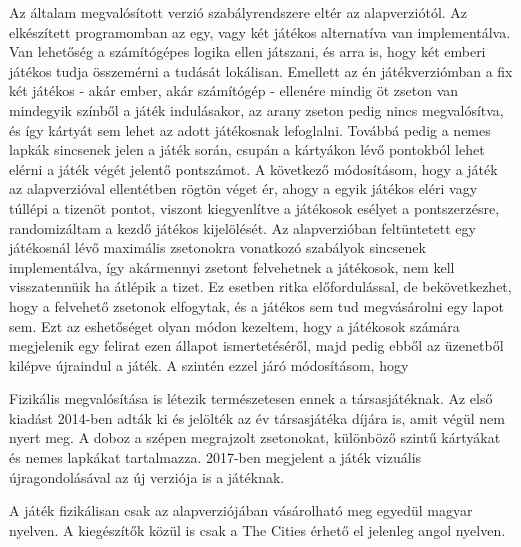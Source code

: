Az általam megvalósított verzió szabályrendszere eltér az alapverziótól. Az elkészített programomban az egy, vagy két játékos alternatíva van implementálva. Van lehetőség a számítógépes logika ellen játszani, és arra is, hogy két emberi játékos tudja összemérni a tudását lokálisan. Emellett az én játékverziómban a fix két játékos - akár ember, akár számítógép - ellenére mindig öt zseton van mindegyik színből a játék indulásakor, az arany zseton pedig nincs megvalósítva, és így kártyát sem lehet az adott játékosnak lefoglalni. Továbbá pedig a nemes lapkák sincsenek jelen a játék során, csupán a kártyákon lévő pontokból lehet elérni a játék végét jelentő pontszámot. A következő módosításom, hogy a játék az alapverzióval ellentétben rögtön véget ér, ahogy a egyik játékos eléri vagy túllépi a tizenöt pontot, viszont kiegyenlítve a játékosok esélyet a pontszerzésre, randomizáltam a kezdő játékos kijelölését. Az alapverzióban feltüntetett egy játékosnál lévő maximális zsetonokra vonatkozó szabályok sincsenek implementálva, így akármennyi zsetont felvehetnek a játékosok, nem kell visszatennüik ha átlépik a tizet. Ez esetben ritka előfordulással, de bekövetkezhet, hogy a felvehető zsetonok elfogytak, és a játékos sem tud megvásárolni egy lapot sem. Ezt az eshetőséget olyan módon kezeltem, hogy a játékosok számára megjelenik egy felirat ezen állapot ismertetéséről, majd pedig ebből az üzenetből kilépve újraindul a játék. A szintén ezzel járó módosításom, hogy 


Fizikális megvalósítása is létezik természetesen ennek a társasjátéknak. Az első kiadást 2014-ben adták ki és jelölték az év társasjátéka díjára is, amit végül nem nyert meg. A doboz a szépen megrajzolt zsetonokat, különböző szintű kártyákat és nemes lapkákat tartalmazza. 2017-ben megjelent a játék vizuális újragondolásával az új verziója is a játéknak.\par

A játék fizikálisan csak az alapverziójában vásárolható meg egyedül magyar nyelven. A kiegészítők közül is csak a The Cities érhető el jelenleg angol nyelven.

